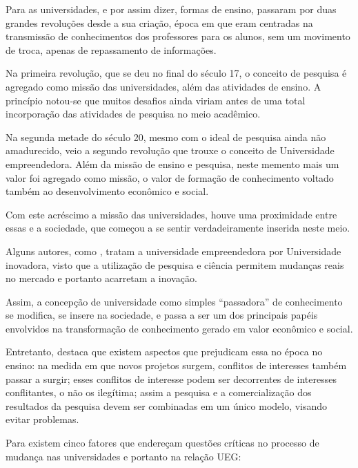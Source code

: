 Para  as universidades, e por assim dizer, formas de ensino, passaram por duas grandes revoluções desde a sua criação, época em que eram centradas na transmissão de conhecimentos dos professores para os alunos, sem um movimento de troca, apenas de repassamento de informações.

Na primeira revolução, que se deu no final do século 17, o conceito de pesquisa é agregado como missão das universidades, além das atividades de ensino. A princípio notou-se que muitos desafios ainda viriam antes de uma total incorporação das atividades de pesquisa no meio acadêmico.

Na segunda metade do século 20, mesmo com o ideal de pesquisa ainda não amadurecido, veio a segundo revolução que trouxe o conceito de Universidade empreendedora. Além da missão de ensino e pesquisa, neste memento mais um valor foi agregado como missão, o valor de formação de conhecimento voltado também ao desenvolvimento econômico e social.

Com este acréscimo a missão das universidades, houve uma proximidade entre essas e a sociedade, que começou a se sentir verdadeiramente inserida neste meio.

Alguns autores, como , tratam a universidade empreendedora por Universidade inovadora, visto que a utilização de pesquisa e ciência permitem mudanças reais no mercado e portanto acarretam a inovação.

Assim, a concepção de universidade como simples “passadora” de conhecimento se modifica, se insere na sociedade, e passa a ser um dos principais papéis envolvidos na transformação de conhecimento gerado em valor econômico e social.

Entretanto,  destaca que existem aspectos que prejudicam essa no época no ensino: na medida em que novos projetos surgem, conflitos de interesses também passar a surgir; esses conflitos de interesse podem ser decorrentes de interesses conflitantes, o não os ilegítima; assim a pesquisa e a comercialização dos resultados da pesquisa devem ser combinadas em um único modelo, visando evitar problemas.

Para  existem cinco fatores que endereçam questões críticas no processo de mudança nas universidades e portanto na relação UEG:

